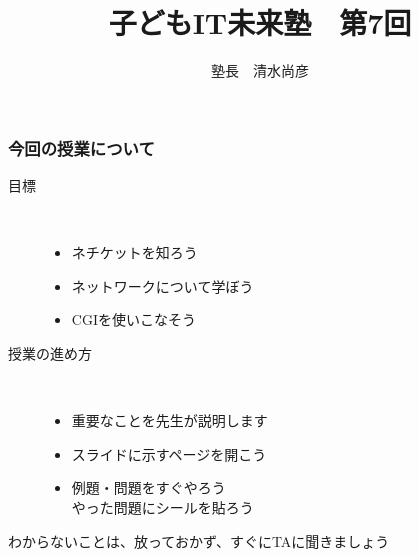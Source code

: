 \documentclass[dvipdfmx]{beamer}
\title{子どもIT未来塾　第7回}
\author{塾長　清水尚彦}
\begin{document}



\begin{frame}[fragile]
	\frametitle{今回の授業について ~~~}
		\begin{description}
			\item[目標] ~\\
				\begin{itemize}
					\item ネチケットを知ろう
					\item ネットワークについて学ぼう
					\item CGIを使いこなそう
				\end{itemize}

			\item[授業の進め方]~\\
				\begin{itemize}
					\item 重要なことを先生が説明します
					\item スライドに示すページを開こう
					\item 例題・問題をすぐやろう\\
						やった問題にシールを貼ろう
				\end{itemize}
		\end{description}
		\vfill
		わからないことは、放っておかず、すぐにTAに聞きましょう
\end{frame}
\end{document}
